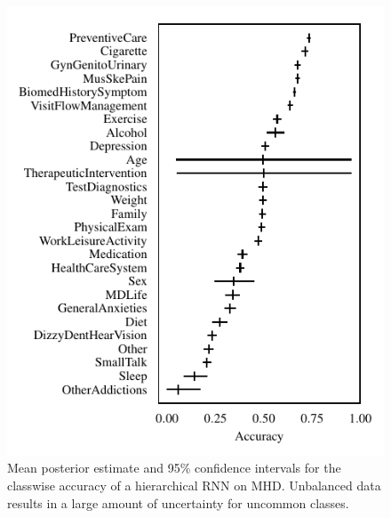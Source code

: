 \documentclass{article}
\begin{document}
\begin{figure}[t]
    \centering
    \includegraphics{figures/mhd_accuracy.pdf}  
    \caption{
        Mean posterior estimate and 95\% confidence intervals for the classwise accuracy of a hierarchical RNN on MHD.
        Unbalanced data results in a large amount of uncertainty for uncommon classes.
    }
    \label{fig:mhd_acc}
\end{figure}
\end{document}
